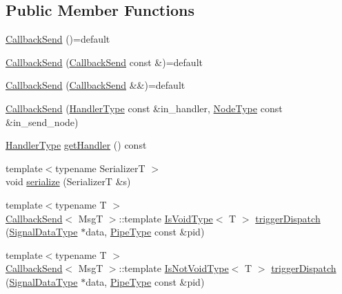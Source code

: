 \subsection*{Public Member Functions}
\begin{DoxyCompactItemize}
\item 
\hyperlink{structvt_1_1pipe_1_1callback_1_1_callback_send_aad073e948c05410190ba09425772d3a3}{Callback\+Send} ()=default
\item 
\hyperlink{structvt_1_1pipe_1_1callback_1_1_callback_send_ae45cdb5d7d006708d6bbae455c4a22d1}{Callback\+Send} (\hyperlink{structvt_1_1pipe_1_1callback_1_1_callback_send}{Callback\+Send} const \&)=default
\item 
\hyperlink{structvt_1_1pipe_1_1callback_1_1_callback_send_accc854042b241e9e5149f4c48da57ed1}{Callback\+Send} (\hyperlink{structvt_1_1pipe_1_1callback_1_1_callback_send}{Callback\+Send} \&\&)=default
\item 
\hyperlink{structvt_1_1pipe_1_1callback_1_1_callback_send_a058cceb367d32fe1235f1f05bf6d387d}{Callback\+Send} (\hyperlink{namespacevt_af64846b57dfcaf104da3ef6967917573}{Handler\+Type} const \&in\+\_\+handler, \hyperlink{namespacevt_a866da9d0efc19c0a1ce79e9e492f47e2}{Node\+Type} const \&in\+\_\+send\+\_\+node)
\item 
\hyperlink{namespacevt_af64846b57dfcaf104da3ef6967917573}{Handler\+Type} \hyperlink{structvt_1_1pipe_1_1callback_1_1_callback_send_ad02a9711c4603807d6fe40a5dd3b4859}{get\+Handler} () const
\item 
{\footnotesize template$<$typename SerializerT $>$ }\\void \hyperlink{structvt_1_1pipe_1_1callback_1_1_callback_send_ae3abb8abfeee32b445a4ff13fd591745}{serialize} (SerializerT \&s)
\item 
{\footnotesize template$<$typename T $>$ }\\\hyperlink{structvt_1_1pipe_1_1callback_1_1_callback_send}{Callback\+Send}$<$ MsgT $>$\+::template \hyperlink{structvt_1_1pipe_1_1callback_1_1_callback_send_afbb9475a84ba4a7b3db3c7493672dbe6}{Is\+Void\+Type}$<$ T $>$ \hyperlink{structvt_1_1pipe_1_1callback_1_1_callback_send_aa9d0685e0564118a4198640ae8ef640c}{trigger\+Dispatch} (\hyperlink{structvt_1_1pipe_1_1callback_1_1_callback_send_a5b21820f25b28f980921b1fe24d8a2dc}{Signal\+Data\+Type} $\ast$data, \hyperlink{namespacevt_ac9852acda74d1896f48f406cd72c7bd3}{Pipe\+Type} const \&pid)
\item 
{\footnotesize template$<$typename T $>$ }\\\hyperlink{structvt_1_1pipe_1_1callback_1_1_callback_send}{Callback\+Send}$<$ MsgT $>$\+::template \hyperlink{structvt_1_1pipe_1_1callback_1_1_callback_send_adb85e64e67e00aa71a9c173565dfb7dc}{Is\+Not\+Void\+Type}$<$ T $>$ \hyperlink{structvt_1_1pipe_1_1callback_1_1_callback_send_a26915bf9dac921974b7d4a7cb156083a}{trigger\+Dispatch} (\hyperlink{structvt_1_1pipe_1_1callback_1_1_callback_send_a5b21820f25b28f980921b1fe24d8a2dc}{Signal\+Data\+Type} $\ast$data, \hyperlink{namespacevt_ac9852acda74d1896f48f406cd72c7bd3}{Pipe\+Type} const \&pid)
\end{DoxyCompactItemize}
